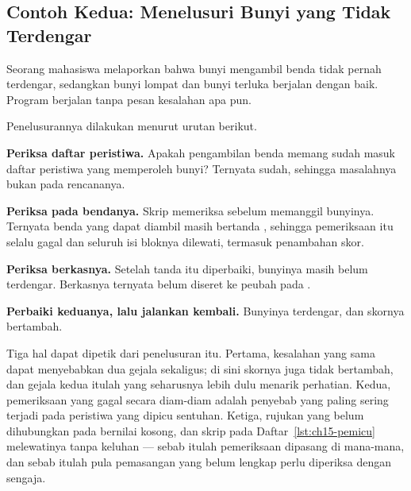 \subsection{Contoh Kedua: Menelusuri Bunyi yang Tidak Terdengar}

\begin{contohbox}
Seorang mahasiswa melaporkan bahwa bunyi mengambil benda tidak pernah
terdengar, sedangkan bunyi lompat dan bunyi terluka berjalan dengan baik.
Program berjalan tanpa pesan kesalahan apa pun.
\end{contohbox}

Penelusurannya dilakukan menurut urutan berikut.

\begin{langkah}
  \item \textbf{Periksa daftar peristiwa.} Apakah pengambilan benda memang
        sudah masuk daftar peristiwa yang memperoleh bunyi? Ternyata sudah,
        sehingga masalahnya bukan pada rencananya.
  \item \textbf{Periksa  pada bendanya.} Skrip memeriksa
         sebelum memanggil bunyinya. Ternyata
        benda yang dapat diambil masih bertanda , sehingga
        pemeriksaan itu selalu gagal dan seluruh isi bloknya dilewati,
        termasuk penambahan skor.
  \item \textbf{Periksa berkasnya.} Setelah tanda itu diperbaiki, bunyinya
        masih belum terdengar. Berkasnya ternyata belum diseret ke peubah
         pada .
  \item \textbf{Perbaiki keduanya, lalu jalankan kembali.} Bunyinya terdengar,
        dan skornya bertambah.
\end{langkah}

Tiga hal dapat dipetik dari penelusuran itu. Pertama, kesalahan yang sama dapat
menyebabkan dua gejala sekaligus; di sini skornya juga tidak bertambah, dan
gejala kedua itulah yang seharusnya lebih dulu menarik perhatian. Kedua,
pemeriksaan yang gagal secara diam-diam adalah penyebab yang paling sering
terjadi pada peristiwa yang dipicu sentuhan. Ketiga, rujukan yang belum
dihubungkan pada  bernilai kosong, dan skrip pada
Daftar~\ref{lst:ch15-pemicu} melewatinya tanpa keluhan --- sebab itulah
pemeriksaan  dipasang di mana-mana, dan sebab itulah
pula pemasangan yang belum lengkap perlu diperiksa dengan sengaja.
